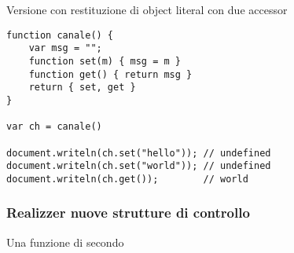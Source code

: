 Versione con restituzione di object literal con due accessor
\begin{verbatim}
function canale() {
    var msg = "";
    function set(m) { msg = m }
    function get() { return msg }
    return { set, get }
}

var ch = canale()

document.writeln(ch.set("hello")); // undefined
document.writeln(ch.set("world")); // undefined
document.writeln(ch.get());        // world
\end{verbatim}

\subsubsection{Realizzer nuove strutture di controllo}
Una funzione di secondo

























